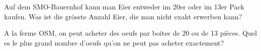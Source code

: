 Auf dem SMO-Bauernhof kann man Eier entweder im 20er oder im 13er Pack kaufen. Was ist die grösste Anzahl Eier, die man nicht exakt erwerben kann?

\bigskip

A la ferme OSM, on peut acheter des oeufs par boites de 20 ou de 13 pièces. Quel es le plus grand nombre d'oeufs qu'on ne peut pas acheter exactement?